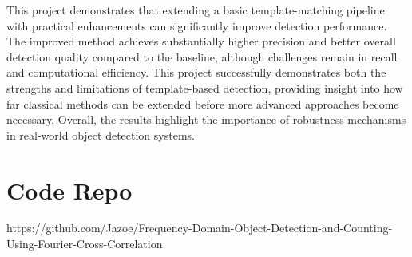 \documentclass[11pt, letterpaper, twoside]{article}
\begin{document}
This project demonstrates that extending a basic template-matching pipeline with practical enhancements can significantly improve detection performance. The improved method achieves substantially higher precision and better overall detection quality compared to the baseline, although challenges remain in recall and computational efficiency. This project successfully demonstrates both the strengths and limitations of template-based detection, providing insight into how far classical methods can be extended before more advanced approaches become necessary. Overall, the results highlight the importance of robustness mechanisms in real-world object detection systems.

\section{Code Repo}
https://github.com/Jazoe/Frequency-Domain-Object-Detection-and-Counting-Using-Fourier-Cross-Correlation
\end{document}
